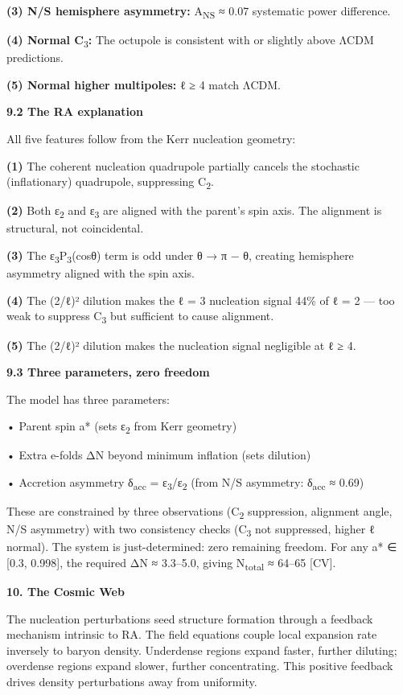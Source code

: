 \documentclass[12pt,a4paper]{article}
\begin{document}
\textbf{(3) N/S hemisphere asymmetry:} A\textsubscript{NS} ≈ 0.07
systematic power difference.

\textbf{(4) Normal C}\textsubscript{3}\textbf{:} The octupole is
consistent with or slightly above ΛCDM predictions.

\textbf{(5) Normal higher multipoles:} ℓ ≥ 4 match ΛCDM.

\textbf{9.2 The RA explanation}

All five features follow from the Kerr nucleation geometry:

\textbf{(1)} The coherent nucleation quadrupole partially cancels the
stochastic (inflationary) quadrupole, suppressing C\textsubscript{2}.

\textbf{(2)} Both ε\textsubscript{2} and ε\textsubscript{3} are aligned
with the parent's spin axis. The alignment is structural, not
coincidental.

\textbf{(3)} The ε\textsubscript{3}P\textsubscript{3}(cosθ) term is odd
under θ → π − θ, creating hemisphere asymmetry aligned with the spin
axis.

\textbf{(4)} The (2/ℓ)² dilution makes the ℓ = 3 nucleation signal 44\%
of ℓ = 2 --- too weak to suppress C\textsubscript{3} but sufficient to
cause alignment.

\textbf{(5)} The (2/ℓ)² dilution makes the nucleation signal negligible
at ℓ ≥ 4.

\textbf{9.3 Three parameters, zero freedom}

The model has three parameters:

• Parent spin a* (sets ε\textsubscript{2} from Kerr geometry)

• Extra e-folds ΔN beyond minimum inflation (sets dilution)

• Accretion asymmetry δ\textsubscript{acc} =
ε\textsubscript{3}/ε\textsubscript{2} (from N/S asymmetry:
δ\textsubscript{acc} ≈ 0.69)

These are constrained by three observations (C\textsubscript{2}
suppression, alignment angle, N/S asymmetry) with two consistency checks
(C\textsubscript{3} not suppressed, higher ℓ normal). The system is
just-determined: zero remaining freedom. For any a* ∈ {[}0.3, 0.998{]},
the required ΔN ≈ 3.3--5.0, giving N\textsubscript{total} ≈ 64--65
{[}CV{]}.

\textbf{10. The Cosmic Web}

The nucleation perturbations seed structure formation through a feedback
mechanism intrinsic to RA. The field equations couple local expansion
rate inversely to baryon density. Underdense regions expand faster,
further diluting; overdense regions expand slower, further
concentrating. This positive feedback drives density perturbations away
from uniformity.
\end{document}
